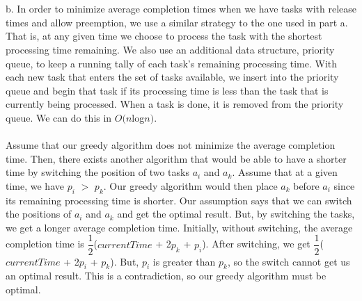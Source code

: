 \documentclass[]{report}
\begin{document}
\begin{enumerate}
	\\
	\\
	b. In order to minimize average completion times when we have tasks with release times and allow preemption, we use a similar strategy to the one used in part a. That is, at any given time we choose to process the task with the shortest processing time remaining. We also use an additional data structure, priority queue, to keep a running tally of each task's remaining processing time. With each new task that enters the set of tasks available, we insert into the priority queue and begin that task if its processing time is less than the task that is currently being processed. When a task is done, it is removed from the priority queue. We can do this in $ O(n$log$n) $. 
	\\
	\\
	Assume that our greedy algorithm does not minimize the average completion time. Then, there exists another algorithm that would be able to have a shorter time by switching the position of two tasks $ a_{i} $ and $ a_{k} $. Assume that at a given time, we have $ p_{i} $ $>$ $ p_{k} $. Our greedy algorithm would then place $ a_{k} $ before $ a_{i} $ since its remaining processing time is shorter. Our assumption says that we can switch the positions of $ a_{i} $ and $ a_{k} $ and get the optimal result. But, by switching the tasks, we get a longer average completion time. Initially, without switching, the average completion time is $ \dfrac{1}{2} $($ currentTime $ + 2$ p_{k} $ + $ p_{i} $). After switching, we get $ \dfrac{1}{2} $($ currentTime $ + 2$ p_{i} $ + $ p_{k} $). But, $ p_{i} $ is greater than $ p_{k} $, so the switch cannot get us an optimal result. This is a contradiction, so our greedy algorithm must be optimal. 
	\\
		

\end{enumerate}
\end{document}
